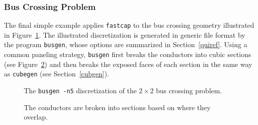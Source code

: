 \subsubsection{Bus Crossing Problem}
\label{busxin}

The final simple
example applies {\tt fastcap} to the bus crossing geometry illustrated
in Figure~\ref{busses}. The illustrated discretization is generated
in generic file format by the program {\tt busgen}, 
whose options are summarized
in Section~\ref{quiref}.  Using a common paneling strategy,
{\tt busgen} first breaks the conductors into cubic sections
(see Figure~\ref{sections}) and then breaks the exposed faces of each section
in the same way as {\tt cubegen} (see Section~\ref{cubgen}).
%
%
\begin{figure}
\centerline{
}
\caption{The {\tt busgen -n5} discretization of the $2\times 2$ bus crossing problem.}
\label{busses}
\end{figure}
%
%
\begin{figure}
\centerline{
}
\caption{The conductors are broken into sections based on where they overlap.}
\label{sections}
\end{figure}

